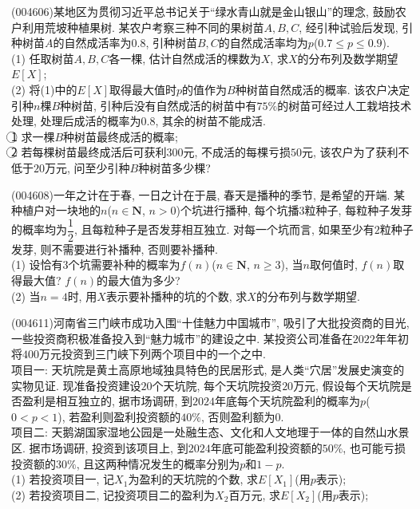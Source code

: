 \item (004606)某地区为贯彻习近平总书记关于``绿水青山就是金山银山''的理念, 鼓励农户利用荒坡种植果树. 某农户考察三种不同的果树苗$A,B,C$, 经引种试验后发现, 引种树苗$A$的自然成活率为$0.8$, 引种树苗$B,C$的自然成活率均为$p$($0.7\le p\le 0.9$).\\
(1) 任取树苗$A,B,C$各一棵, 估计自然成活的棵数为$X$, 求$X$的分布列及数学期望$E[X]$;\\
(2) 将(1)中的$E[X]$取得最大值时$p$的值作为$B$种树苗自然成活的概率. 该农户决定引种$n$棵$B$种树苗, 引种后没有自然成活的树苗中有$75\%$的树苗可经过人工栽培技术处理, 处理后成活的概率为$0.8$, 其余的树苗不能成活.\\
\textcircled{1} 求一棵$B$种树苗最终成活的概率;\\
\textcircled{2} 若每棵树苗最终成活后可获利$300$元, 不成活的每棵亏损$50$元, 该农户为了获利不低于$20$万元, 问至少引种$B$种树苗多少棵?
\item (004608)一年之计在于春, 一日之计在于晨, 春天是播种的季节, 是希望的开端. 某种植户对一块地的$n$($n\in \mathbf{N}$, $n>0$)个坑进行播种, 每个坑播$3$粒种子, 每粒种子发芽的概率均为$\dfrac 12$, 且每粒种子是否发芽相互独立. 对每一个坑而言, 如果至少有$2$粒种子发芽, 则不需要进行补播种, 否则要补播种.\\
(1) 设恰有$3$个坑需要补种的概率为$f(n)$($n\in \mathbf{N}$, $n\ge 3$), 当$n$取何值时, $f(n)$取得最大值? $f(n)$的最大值为多少?\\
(2) 当$n=4$时, 用$X$表示要补播种的坑的个数, 求$X$的分布列与数学期望.
\item (004611)河南省三门峡市成功入围``十佳魅力中国城市'', 吸引了大批投资商的目光, 一些投资商积极准备投入到``魅力城市''的建设之中. 某投资公司准备在$2022$年年初将$400$万元投资到三门峡下列两个项目中的一个之中.\\
项目一: 天坑院是黄土高原地域独具特色的民居形式, 是人类``穴居''发展史演变的实物见证. 现准备投资建设$20$个天坑院, 每个天坑院投资$20$万元, 假设每个天坑院是否盈利是相互独立的, 据市场调研, 到$2024$年底每个天坑院盈利的概率为$p$($0<p<1$), 若盈利则盈利投资额的$40\%$, 否则盈利额为$0$.\\
项目二: 天鹅湖国家湿地公园是一处融生态、文化和人文地理于一体的自然山水景区. 据市场调研, 投资到该项目上, 到$2024$年底可能盈利投资额的$50\%$, 也可能亏损投资额的$30\%$, 且这两种情况发生的概率分别为$p$和$1-p$.\\
(1) 若投资项目一, 记$X_1$为盈利的天坑院的个数, 求$E[X_1]$(用$p$表示);\\
(2) 若投资项目二, 记投资项目二的盈利为$X_2$百万元, 求$E[X_2]$(用$p$表示);\\
